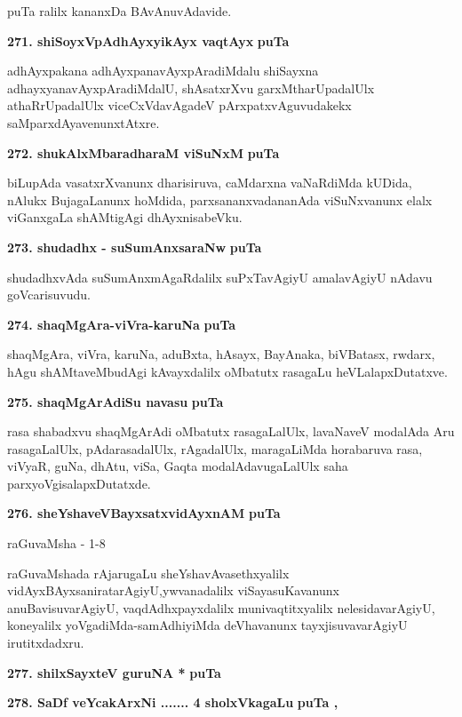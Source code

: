 \smallskip
puTa \pageref{38}ralilx kananxDa BAvAnuvAdavide.

\eject

\noindent
\textbf{271. shiSoyxVpAdhAyxyikAyx vaqtAyx} \hfill{\bf puTa \pageref{105}}

\smallskip
adhAyxpakana adhAyxpanavAyxpAradiMdalu shiSayxna adhayxyanavAyxpAradiMdalU, shAsatxrXvu garxMtha\-rUpa\-da\-lUlx athaRrUpadalUlx viceCxVdavAgadeV pArxpatxvAguvudakekx saMparxdAyavenunxtAtxre.

\medskip
\noindent
\textbf{272. shukAlxMbaradharaM viSuNxM} \hfill{\bf puTa \pageref{206}}

\smallskip
biLupAda vasatxrXvanunx dharisiruva, caMdarxna vaNaRdiMda kUDida, nAlukx BujagaLanunx hoMdida, parxsananx\-vadananAda viSuNxvanunx elalx viGanxgaLa shAMtigAgi dhAyxnisabeVku.

\medskip
\noindent
\textbf{273. shudadhx - suSumAnxsaraNw} \hfill{\bf puTa \pageref{157e}}

\smallskip
shudadhxvAda suSumAnxmAgaRdalilx suPxTavAgiyU amalavAgiyU nAdavu goVcarisuvudu.

\medskip
\noindent
\textbf{274. shaqMgAra-viVra-karuNa} \hfill{\bf puTa \pageref{230}}

\smallskip
shaqMgAra, viVra, karuNa, aduBxta, hAsayx, BayAnaka, biVBatasx, rwdarx, hAgu shAMtaveMbudAgi kAvayx\-dalilx oMbatutx rasagaLu heVLalapxDutatxve.

\medskip
\noindent
\textbf{275. shaqMgArAdiSu navasu} \hfill{\bf puTa \pageref{218}}

\smallskip
rasa shabadxvu shaqMgArAdi oMbatutx rasagaLalUlx, lavaNaveV modalAda Aru rasagaLalUlx, pAdarasa\-dalUlx, rAgadalUlx, maragaLiMda horabaruva rasa, viVyaR, guNa, dhAtu, viSa, Gaqta modalAdavu\-gaLalUlx saha\- parxyoVgisalapxDutatxde.

\smallskip
\noindent
\textbf{276. sheYshaveVBayxsatxvidAyxnAM} \hfill{\bf puTa \pageref{28}}

\hfill{raGuvaMsha - 1-8}

raGuvaMshada rAjarugaLu sheYshavAvasethxyalilx vidAyxBAyxsaniratarAgiyU,\break ywvana\-dalilx viSayasuKa\-vanunx anuBavisuvarAgiyU, vaqdAdhxpayxdalilx munivaqtitx\-yalilx nelesidavarAgiyU, koneyalilx yoVga\-diMda-samAdhiyiMda deVhavanunx tayxjisuvavarAgiyU irutitxdadxru.

\medskip
\noindent
\textbf{277. shilxSayxteV guruNA *} \hfill{\bf puTa \pageref{190}}


\medskip
\noindent
\textbf{278. SaDf veYcakArxNi ....... 4 sholxVkagaLu} \hfill{\bf puTa \pageref{154}, \pageref{155}}

